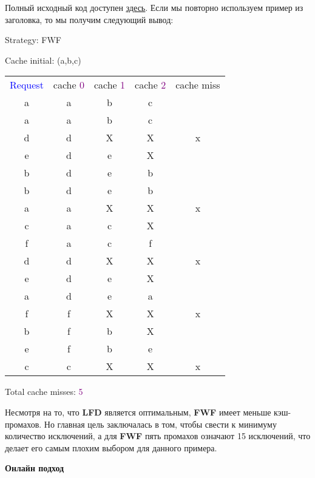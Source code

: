 Полный исходный код доступен \href{https://pastebin.com/AF7EC2xJ}{\underline{здесь}}. Если мы повторно используем пример из заголовка, то мы получим следующий вывод:

\begin{tcolorbox}
{
Strategy: FWF

\vspace{\baselineskip}

Cache initial: (a,b,c)

\vspace{\baselineskip}
\begin{tabular}{*{5}{c}}
\textcolor{Blue}{Request} & cache \textcolor{Purple}{0} & cache \textcolor{Purple}{1} & cache \textcolor{Purple}{2} & cache miss \\
a & a & b & c & \ \\
a & a & b & c & \ \\
d & d & X & X & x \\
e & d & e & X & \ \\
b & d & e & b & \ \\
b & d & e & b & \ \\
a & a & X & X & x \\
c & a & c & X & \ \\
f & a & c & f & \ \\
d & d & X & X & x \\
e & d & e & X & \ \\
a & d & e & a & \ \\
f & f & X & X & x \\
b & f & b & X & \ \\
e & f & b & e & \ \\
c & c & X & X & x \\
\end{tabular}

\vspace{\baselineskip}

Total cache misses: \textcolor{Purple}{5}}
\end{tcolorbox}

Несмотря на то, что \textbf{LFD} является оптимальным, \textbf{FWF} имеет меньше кэш-промахов. Но главная цель заключалась в том, чтобы свести к минимуму количество исключений, а для \textbf{FWF} пять промахов означают 15 исключений, что делает его самым плохим выбором для данного примера.

\vspace{\baselineskip}

\textbf{Онлайн подход}

